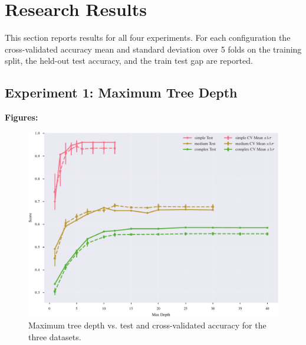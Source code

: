 \documentclass[conference]{IEEEtran}
\begin{document}
\section{Research Results}

\label{sec:results}

This section reports results for all four experiments. For each configuration the cross-validated accuracy mean and standard deviation over 5 folds on 
the training split, the held-out test accuracy, and the train test gap are reported. 


\subsection{Experiment 1: Maximum Tree Depth}
\label{sec:results-exp1}

\textbf{Figures:}
\begin{figure}[H]
  \centering
  \includegraphics[width=\linewidth]{images/all_datasets_depth_accuracy.pdf}
  \caption{Maximum tree depth vs. test and cross-validated accuracy for the three datasets.}
  \label{fig:exp1-depth-acc}
\end{figure}
\end{document}
